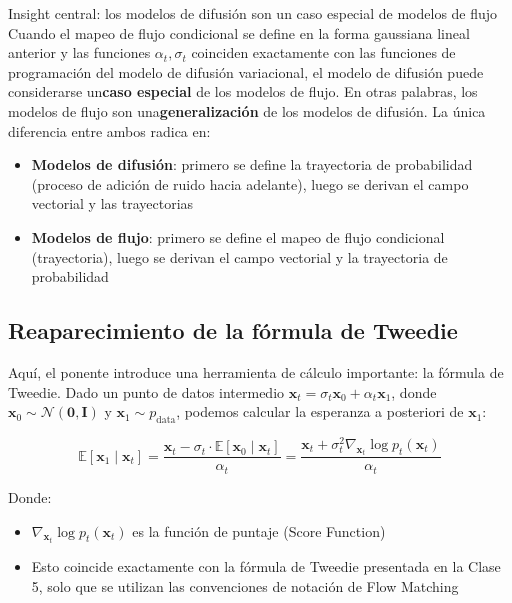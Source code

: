 \documentclass[a4paper]{article}
\begin{document}
\begin{importantbox}{Insight central: los modelos de difusión son un caso especial de modelos de flujo}
Cuando el mapeo de flujo condicional se define en la forma gaussiana lineal anterior y las funciones $\alpha_t, \sigma_t$ coinciden exactamente con las funciones de programación del modelo de difusión variacional, el modelo de difusión puede considerarse un\textbf{caso especial} de los modelos de flujo. En otras palabras, los modelos de flujo son una\textbf{generalización} de los modelos de difusión. La única diferencia entre ambos radica en:
\begin{itemize}
    \item \textbf{Modelos de difusión}: primero se define la trayectoria de probabilidad (proceso de adición de ruido hacia adelante), luego se derivan el campo vectorial y las trayectorias
    \item \textbf{Modelos de flujo}: primero se define el mapeo de flujo condicional (trayectoria), luego se derivan el campo vectorial y la trayectoria de probabilidad
\end{itemize}
\end{importantbox}

\subsection{Reaparecimiento de la fórmula de Tweedie}

Aquí, el ponente introduce una herramienta de cálculo importante: la fórmula de Tweedie. Dado un punto de datos intermedio $\mathbf{x}_t = \sigma_t \mathbf{x}_0 + \alpha_t \mathbf{x}_1$, donde $\mathbf{x}_0 \sim \mathcal{N}(\mathbf{0}, \mathbf{I})$ y $\mathbf{x}_1 \sim p_{\text{data}}$, podemos calcular la esperanza a posteriori de $\mathbf{x}_1$:

$$\mathbb{E}[\mathbf{x}_1 \mid \mathbf{x}_t] = \frac{\mathbf{x}_t - \sigma_t \cdot \mathbb{E}[\mathbf{x}_0 \mid \mathbf{x}_t]}{\alpha_t} = \frac{\mathbf{x}_t + \sigma_t^2 \nabla_{\mathbf{x}_t} \log p_t(\mathbf{x}_t)}{\alpha_t}$$

Donde:
\begin{itemize}
    \item $\nabla_{\mathbf{x}_t} \log p_t(\mathbf{x}_t)$ es la función de puntaje (Score Function)
    \item Esto coincide exactamente con la fórmula de Tweedie presentada en la Clase 5, solo que se utilizan las convenciones de notación de Flow Matching
\end{itemize}
\end{document}
